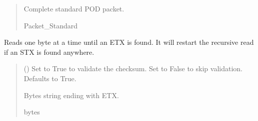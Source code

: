 \documentclass[letterpaper,10pt,english]{sphinxmanual}
\begin{document}
\begin{fulllineitems}
\begin{fulllineitems}
\begin{quote}
\begin{description}
\sphinxAtStartPar
Complete standard POD packet.

\sphinxAtStartPar
Packet\_Standard

\end{description}\end{quote}

\end{fulllineitems}


\begin{fulllineitems}
\label{\detokenize{PodApi.Devices:PodApi.Devices.BasicPodProtocol.Pod._Read_ToETX}}
\pysigstartsignatures
{}
\pysigstopsignatures
\sphinxAtStartPar
Reads one byte at a time until an ETX is found. It will restart the recursive read if an STX         is found anywhere.
\begin{quote}\begin{description}
\sphinxAtStartPar
{} (\sphinxstyleliteralemphasis{\sphinxupquote{, }}) \textendash{} Set to True to validate the checksum. Set to False to skip                 validation. Defaults to True.

\sphinxAtStartPar
Bytes string ending with ETX.

\sphinxAtStartPar
bytes

\end{description}\end{quote}

\end{fulllineitems}



\end{fulllineitems}
\end{document}
